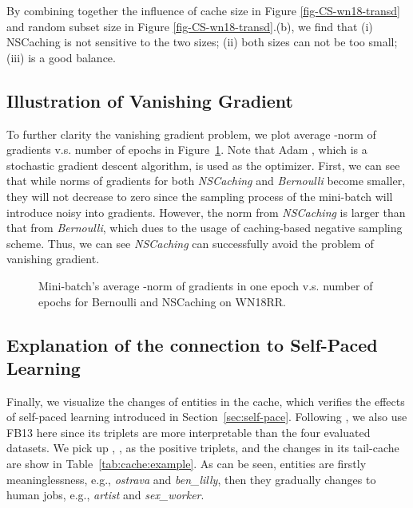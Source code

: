 \documentclass[conference]{IEEEtran}
\begin{document}
By combining together the influence of cache size  in Figure \ref{fig-CS-wn18-transd} and random subset size  in Figure \ref{fig-CS-wn18-transd}.(b),
we find that 
(i) NSCaching is not sensitive to the two sizes; 
(ii) both sizes can not be too small; 
(iii)  is a good balance.


{
\subsection{Illustration of Vanishing Gradient}

To further clarity the vanishing gradient problem, we plot average -norm of gradients v.s. number of epochs in Figure~\ref{fig-GN-wn18rr}. 
Note that Adam \cite{kingma2014adam}, which is a stochastic gradient descent algorithm, is used as the optimizer.
First, we can see that while norms of gradients for both \textit{NSCaching} and \textit{Bernoulli} become smaller, 
they will not decrease to zero since the sampling process of the mini-batch will introduce noisy into gradients.
However, the norm from \textit{NSCaching} is larger than that from \textit{Bernoulli},
which dues to the usage of caching-based negative sampling scheme.
Thus, we can see \textit{NSCaching} can successfully avoid the problem of vanishing gradient.

\begin{figure}[ht]
\centering
{}

\caption{Mini-batch's average -norm of gradients in one epoch v.s. number of epochs for Bernoulli and NSCaching on WN18RR.}
\label{fig-GN-wn18rr}
\end{figure}
}


\subsection{Explanation of the connection to Self-Paced Learning}
\label{sec:visself}


Finally,
we visualize the changes of entities in the cache,
which verifies the effects of self-paced learning introduced in Section~\ref{sec:self-pace}. 
Following \cite{wang2018incorporating},
we also use FB13 here since its triplets are more interpretable than the four evaluated datasets.
We pick up 
, ,  as the positive triplets, 
and the changes in its tail-cache are show in Table~\ref{tab:cache:example}.
As can be seen,
entities are firstly meaninglessness,
e.g., \textit{ostrava} and \textit{ben\_lilly},
then they gradually changes to human jobs,
e.g., \textit{artist} and \textit{sex\_worker}.
\end{document}
